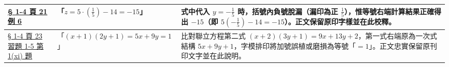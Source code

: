 \documentclass[a4paper,12pt,twoside]{article}
\begin{document}
\begin{table}[H]
\begin{tabularx}{\textwidth}{|p{3.2cm}|p{3.6cm}|X|}
\hyperref[note:b2-ch1-ex6-sign]{§ 1-4 頁 21 例 6} & 
「$z = 5\cdot (\frac{1}{5}) - 14 = -15$」 & 
式中代入 $y=-\frac{1}{5}$ 時，括號內負號脫漏（漏印為正 $\frac{1}{5}$），惟等號右端計算結果正確得出 $-15$（即 $5(-\frac{1}{5})-14 = -15$）。正文保留原印字樣並在此校釋。 \\ \hline

\hyperref[note:b2-ch1-ex1-5-q1-11]{§ 1-4 頁 23 習題 1-5 第 1(xi) 題} & 
「$(x+1)(2y+1) = 5x+9y=1$」 & 
比對聯立方程第二式 $(x+2)(3y+1) = 9x+13y+2$，第一式右端原為一次式結構 $5x+9y+1$，字模排印將加號誤植或磨損為等號「$=1$」。正文忠實保留原刊印文字並在此說明。 \\ \hline

\end{tabularx}
\end{table}

\clearpage
\tableofcontents
\newpage


\end{document}
